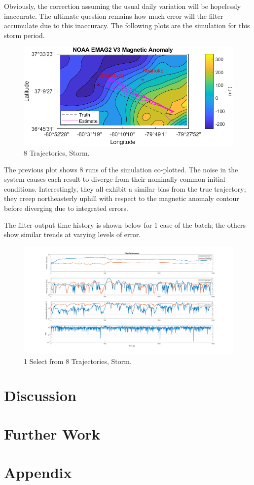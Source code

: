 \documentclass[conf]{new-aiaa}
\begin{document}
Obviously, the correction assuming the usual daily variation will be hopelessly inaccurate. The ultimate question remains how much error will the filter accumulate due to this inaccuracy. The following plots are the simulation for this storm period.

\begin{figure}[H]
\centering
\includegraphics[width=1.0\textwidth]{figures/trajectory_storm_multi.png}
\caption{8 Trajectories, Storm.}
\end{figure}

The previous plot shows 8 runs of the simulation co-plotted. The noise in the system causes each result to diverge from their nominally common initial conditions. Interestingly, they all exhibit a similar bias from the true trajectory; they creep northeasterly uphill with respect to the magnetic anomaly contour before diverging due to integrated errors.

The filter output time history is shown below for 1 case of the batch; the others show similar trends at varying levels of error.

\begin{figure}[H]
\centering
\includegraphics[width=1.0\textwidth]{figures/filter_storm.png}
\caption{1 Select from 8 Trajectories, Storm.}
\end{figure}

\section{Discussion} \label{discussion} %



\section{Further Work} %

\section*{Appendix} %

\end{document}
